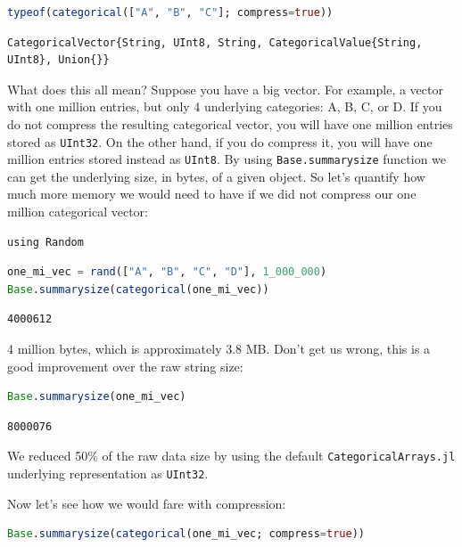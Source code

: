 \documentclass[
  notoc %
]{tufte-book}
\newcommand{\passthrough}[1]{#1}
\begin{document}
\begin{lstlisting}[language=Julia]
typeof(categorical(["A", "B", "C"]; compress=true))
\end{lstlisting}

\begin{lstlisting}
CategoricalVector{String, UInt8, String, CategoricalValue{String, UInt8}, Union{}}
\end{lstlisting}

What does this all mean? Suppose you have a big vector. For example, a
vector with one million entries, but only 4 underlying categories: A, B,
C, or D. If you do not compress the resulting categorical vector, you
will have one million entries stored as
\passthrough{\lstinline!UInt32!}. On the other hand, if you do compress
it, you will have one million entries stored instead as
\passthrough{\lstinline!UInt8!}. By using
\passthrough{\lstinline!Base.summarysize!} function we can get the
underlying size, in bytes, of a given object. So let's quantify how much
more memory we would need to have if we did not compress our one million
categorical vector:

\begin{lstlisting}
using Random
\end{lstlisting}

\begin{lstlisting}[language=Julia]
one_mi_vec = rand(["A", "B", "C", "D"], 1_000_000)
Base.summarysize(categorical(one_mi_vec))
\end{lstlisting}

\begin{lstlisting}
4000612
\end{lstlisting}

4 million bytes, which is approximately 3.8 MB. Don't get us wrong, this
is a good improvement over the raw string size:

\begin{lstlisting}[language=Julia]
Base.summarysize(one_mi_vec)
\end{lstlisting}

\begin{lstlisting}
8000076
\end{lstlisting}

We reduced 50\% of the raw data size by using the default
\passthrough{\lstinline!CategoricalArrays.jl!} underlying representation
as \passthrough{\lstinline!UInt32!}.

Now let's see how we would fare with compression:

\begin{lstlisting}[language=Julia]
Base.summarysize(categorical(one_mi_vec; compress=true))
\end{lstlisting}
\end{document}
